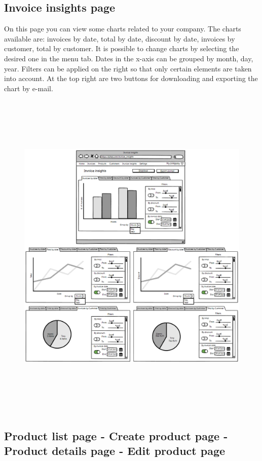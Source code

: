 \subsection{Invoice insights page}
On this page you can view some charts related to your company. The charts available are: invoices by date, total by date, discount by date, invoices by customer, total by customer. It is possible to change charts by selecting the desired one in the menu tab. Dates in the x-axis can be grouped by month, day, year. Filters can be applied on the right so that only certain elements are taken into account. At the top right are two buttons for downloading and exporting the chart by e-mail.
\begin{figure}[h!]
    \centering
    \includegraphics[height=460pt, keepaspectratio]{resources/mockup/Invoice_insights.png}
\end{figure}
\newpage

\subsection{Product list page - Create product page - Product details page - Edit product page}

